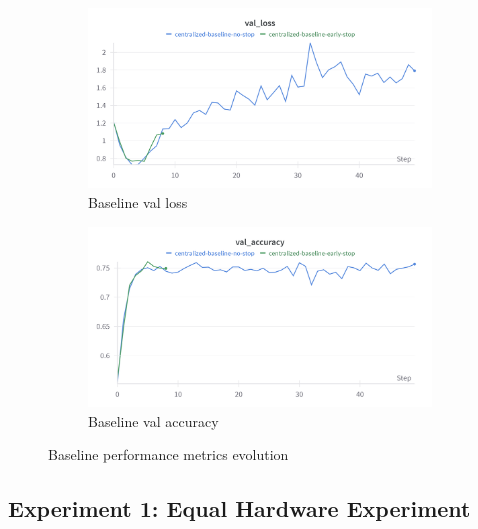 \documentclass[11pt]{article}
\begin{document}
    \begin{figure}[h]
        \centering
        \begin{subfigure}[b]{0.48\textwidth}
            \centering
            \includegraphics[width=\textwidth]{img/experiment_1/baseline_val_loss}
            \caption{Baseline val loss}
            \label{fig:baseline_val_loss}
        \end{subfigure}
        \hfill
        \begin{subfigure}[b]{0.48\textwidth}
            \centering
            \includegraphics[width=\textwidth]{img/experiment_1/baseline_val_acc}
            \caption{Baseline val accuracy}
            \label{fig:baseline_val_acc}
        \end{subfigure}
        \caption{Baseline performance metrics evolution}
        \label{fig:baseline_metrics}
    \end{figure}

    \subsection{Experiment 1: Equal Hardware Experiment}
    \label{subsec:experiment1}
\end{document}

